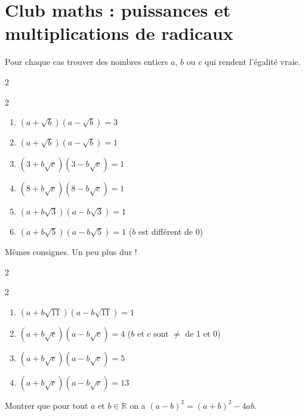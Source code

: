 \documentclass[main.tex]{subfiles}
\begin{document}
\section{Club maths : puissances et multiplications de radicaux}

\begin{exercise} Pour chaque cas trouver des nombres entiers $a$, $b$ ou $c$ qui rendent l'égalité vraie.\vspace{-0.5em}
\begin{multicols}{2} 
	\begin{spacing}{2}
	\begin{enumerate}[label={\arabic*)},leftmargin=*]
		\item  $(a+\sqrt{b})(a-\sqrt{b})=3$
		\item  $(a+\sqrt{b})(a-\sqrt{b})=1$ 
		\item  $(3+b\sqrt{c})(3-b\sqrt{c})=1$
		\item  $(8+b\sqrt{c})(8-b\sqrt{c})=1$
		\item  $(a+b\sqrt{3})(a-b\sqrt{3})=1$
		\item  $(a+b\sqrt{5})(a-b\sqrt{5})=1$ ($b$ est différent de 0)
	\end{enumerate}
\end{spacing}
\end{multicols}\vspace{-0.5em}
\end{exercise}
\begin{exercise} Mêmes consignes. Un peu plus dur !\vspace{-0.5em}
	\begin{multicols}{2} 
		\begin{spacing}{2}
			\begin{enumerate}[label={\arabic*)},leftmargin=*] 
				\item  $(a+b\sqrt{11})(a-b\sqrt{11})=1$
				\item  $(a+b\sqrt{c})(a-b\sqrt{c})=4$ ($b$ et $c$ sont $\neq$ de 1 et 0)
				\item  $(a+b\sqrt{c})(a-b\sqrt{c})=5$ 
				\item  $(a+b\sqrt{c})(a-b\sqrt{c})=13$ 
			\end{enumerate}
		\end{spacing}\vspace{-0.5em}
	\end{multicols}
\end{exercise}
\begin{exercise}[préliminaire]\label{chapter08:club:radicaux:identite} Montrer que pour tout $a$ et $b
\in\mathbb{R}$ on a $(a-b)^2=(a+b)^2-4ab$. 
\end{exercise}
\end{document}
